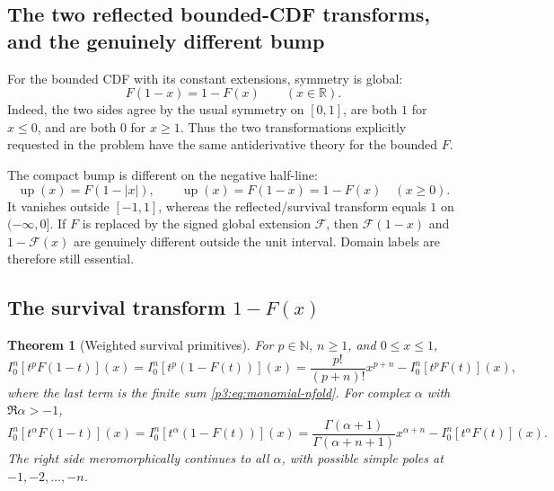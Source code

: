 \documentclass[11pt,oneside]{article}
\newtheorem{theorem}{Theorem}[section]
\theoremstyle{definition}
\theoremstyle{remark}
\newcommand{\Up}{\operatorname{up}}
\newcommand{\R}{\mathbb R}
\newcommand{\N}{\mathbb N}
\newcommand{\1}{\mathbf 1}
\begin{document}
\subsection{The two reflected bounded-CDF transforms, and the genuinely different bump}

For the bounded CDF with its constant extensions, symmetry is global:
\begin{equation}
 F(1-x)=1-F(x)\qquad(x\in\R).                                \label{p3:eq:reflected-global}
\end{equation}
Indeed, the two sides agree by the usual symmetry on $[0,1]$, are both $1$ for $x\le0$,
and are both $0$ for $x\ge1$.  Thus the two transformations explicitly requested in the
problem have the same antiderivative theory for the bounded $F$.

The compact bump is different on the negative half-line:
\begin{equation}
 \Up(x)=F(1-|x|),\qquad
 \Up(x)=F(1-x)=1-F(x)\quad(x\ge0).                            \label{p3:eq:three-agree}
\end{equation}
It vanishes outside $[-1,1]$, whereas the reflected/survival transform equals $1$ on
$(-\infty,0]$.  If $F$ is replaced by the signed global extension $\mathcal F$, then
$\mathcal F(1-x)$ and $1-\mathcal F(x)$ are genuinely different outside the unit interval.
Domain labels are therefore still essential.

\subsection{The survival transform \texorpdfstring{$1-F(x)$}{1-F(x)}}

\begin{theorem}[Weighted survival primitives]
\label{p3:thm:survival}
For $p\in\N$, $n\ge1$, and $0\le x\le1$,
\begin{equation}
 I_0^n[t^pF(1-t)](x)=I_0^n[t^p(1-F(t))](x)
 =\frac{p!}{(p+n)!}x^{p+n}-I_0^n[t^pF(t)](x),                \label{p3:eq:survival-integer}
\end{equation}
where the last term is the finite sum \eqref{p3:eq:monomial-nfold}.  For complex $\alpha$ with
$\Re\alpha>-1$,
\begin{equation}
 I_0^n[t^\alpha F(1-t)](x)=I_0^n[t^\alpha(1-F(t))](x)
 =\frac{\Gamma(\alpha+1)}{\Gamma(\alpha+n+1)}x^{\alpha+n}
  -I_0^n[t^\alpha F(t)](x).                                  \label{p3:eq:survival-fractional}
\end{equation}
The right side meromorphically continues to all $\alpha$, with possible simple poles at
$-1,-2,\ldots,-n$.
\end{theorem}
\end{document}
